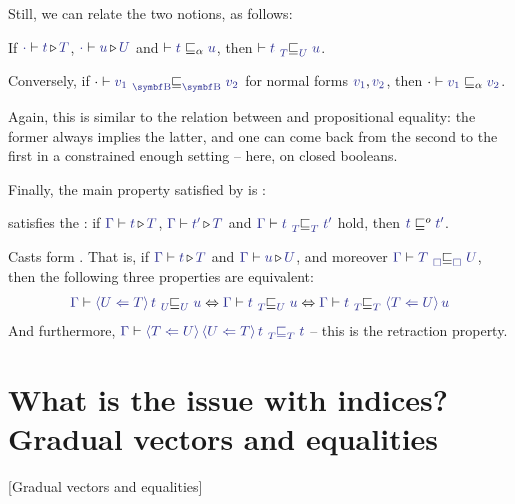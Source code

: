 Still, we can relate the two notions, as follows:
\begin{theorem}
  \label{thm:prop-prop-prec}
   
  If $\cinferty{\emptycon}{t}{T}$, $\cinferty{\emptycon}{u}{U}$ and
  $\vdash \tcol{t} \capre \tcol{u}$, then
  $\vdash \tcol{t} \precision{\tcol{T}}{\tcol{U}} \tcol{u}$.
  
  Conversely, if
    $\emptycon \vdash \tcol{v_1} \precision{\tcol{\Bool}}{\tcol{\Bool}}
    \tcol{v_2}$ for normal forms $\tcol{v_1}, \tcol{v_2}$, then
    $\emptycon \vdash \tcol{v_1} \capre \tcol{v_2}$.

\end{theorem}
Again, this is similar to the relation between  and propositional equality:
the former always implies the latter, and one can come back from the second to the first in
a constrained enough setting – here, on closed booleans.

Finally, the main property satisfied by  is :

\begin{theorem}[\kl{Graduality}]
  \label{thm:graduality}

   satisfies the : if
  $\cinferty{\Gamma}{t}{T}$, $\cinferty{\Gamma}{t'}{T}$ and
  $\tcol{\Gamma} \vdash \tcol{t} \precision{\tcol{T}}{\tcol{T}} \tcol{t'}$ hold, then
  $ \tcol{t} \obsRef \tcol{t'}$.
  
  Casts form . That is, if
  $\cinferty{\Gamma}{t}{T}$ and $\cinferty{\Gamma}{u}{U}$,
  and moreover
    $\tcol{\Gamma} \vdash \tcol{T} \precision{\tcol{\square}}{\tcol{\square}} \tcol{U}$,
  then the following three properties are equivalent:
  \begin{align*}
    \tcol{\Gamma} \vdash \tcol{\cast{T}{U}{t}} \precision{\tcol{U}}{\tcol{U}} \tcol{u}
    \Leftrightarrow  \tcol{\Gamma} \vdash \tcol{t} \precision{\tcol{T}}{\tcol{U}} \tcol{u}
    \Leftrightarrow  \tcol{\Gamma} \vdash \tcol{t}
    \precision{\tcol{T}}{\tcol{T}} \tcol{\cast{U}{T} u}
  \end{align*}
  And furthermore,
    $\tcol{\Gamma} \vdash \tcol{{\cast{U}{T}{\cast{T}{U}{t}}} \precision{\tcol{T}}{\tcol{T}} \tcol{t}}$ – this is the retraction property.
\end{theorem}



\section{What is the issue with indices? Gradual vectors and equalities}
  [Gradual vectors and equalities]
\label{sec:indices-issue}

